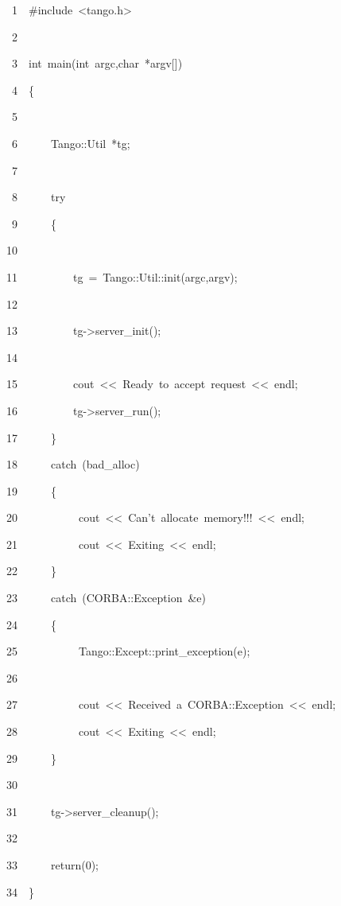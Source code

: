 \begin{lyxcode}
~~~~~1~~\#include~<tango.h>

~~~~~2~~

~~~~~3~~int~main(int~argc,char~{*}argv{[}{]})

~~~~~4~~\{

~~~~~5~~

~~~~~6~~~~~~Tango::Util~{*}tg;

~~~~~7~~~~~~~~~~

~~~~~8~~~~~~try

~~~~~9~~~~~~\{

~~~~10~~~~~~~~~~

~~~~11~~~~~~~~~~tg~=~Tango::Util::init(argc,argv);

~~~~12~~

~~~~13~~~~~~~~~~tg->server\_init();

~~~~14~~

~~~~15~~~~~~~~~~cout~<\textcompwordmark{}<~\textquotedbl{}Ready~to~accept~request\textquotedbl{}~<\textcompwordmark{}<~endl;

~~~~16~~~~~~~~~~tg->server\_run();

~~~~17~~~~~~\}

~~~~18~~~~~~catch~(bad\_alloc)

~~~~19~~~~~~\{

~~~~20~~~~~~~~~~~cout~<\textcompwordmark{}<~\textquotedbl{}Can't~allocate~memory!!!\textquotedbl{}~<\textcompwordmark{}<~endl;

~~~~21~~~~~~~~~~~cout~<\textcompwordmark{}<~\textquotedbl{}Exiting\textquotedbl{}~<\textcompwordmark{}<~endl;

~~~~22~~~~~~\}

~~~~23~~~~~~catch~(CORBA::Exception~\&e)

~~~~24~~~~~~\{

~~~~25~~~~~~~~~~~Tango::Except::print\_exception(e);

~~~~26~~~~~~~~~~~~~~~~~~

~~~~27~~~~~~~~~~~cout~<\textcompwordmark{}<~\textquotedbl{}Received~a~CORBA::Exception\textquotedbl{}~<\textcompwordmark{}<~endl;

~~~~28~~~~~~~~~~~cout~<\textcompwordmark{}<~\textquotedbl{}Exiting\textquotedbl{}~<\textcompwordmark{}<~endl;

~~~~29~~~~~~\}

~~~~30~~

~~~~31~~~~~~tg->server\_cleanup();

~~~~32~~~~~~~~~~~~~~~~~~

~~~~33~~~~~~return(0);

~~~~34~~\}
\end{lyxcode}


